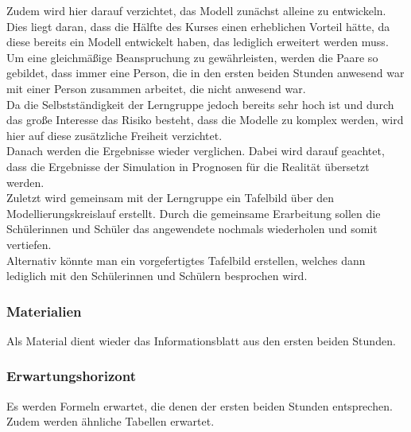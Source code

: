 Zudem wird hier darauf verzichtet, das Modell zunächst alleine zu entwickeln. Dies liegt daran, dass die Hälfte des Kurses einen erheblichen Vorteil hätte, da diese bereits ein Modell entwickelt haben, das lediglich erweitert werden muss. Um eine gleichmäßige Beanspruchung zu gewährleisten, werden die Paare so gebildet, dass immer eine Person, die in den ersten beiden Stunden anwesend war mit einer Person zusammen arbeitet, die nicht anwesend war.\\
Da die Selbstständigkeit der Lerngruppe jedoch bereits sehr hoch ist und durch das große Interesse das Risiko besteht, dass die Modelle zu komplex werden, wird hier auf diese zusätzliche Freiheit verzichtet.\\
Danach werden die Ergebnisse wieder verglichen. Dabei wird darauf geachtet, dass die Ergebnisse der Simulation in Prognosen für die Realität übersetzt werden.\\
Zuletzt wird gemeinsam mit der Lerngruppe ein Tafelbild über den Modellierungskreislauf erstellt. Durch die gemeinsame Erarbeitung sollen die Schülerinnen und Schüler das angewendete nochmals wiederholen und somit vertiefen.\\
Alternativ könnte man ein vorgefertigtes Tafelbild erstellen, welches dann lediglich mit den Schülerinnen und Schülern besprochen wird.


\subsubsection{Materialien}
Als Material dient wieder das Informationsblatt aus den ersten beiden Stunden.
\subsubsection{Erwartungshorizont}
Es werden Formeln erwartet, die denen der ersten beiden Stunden entsprechen. Zudem werden ähnliche Tabellen erwartet.
